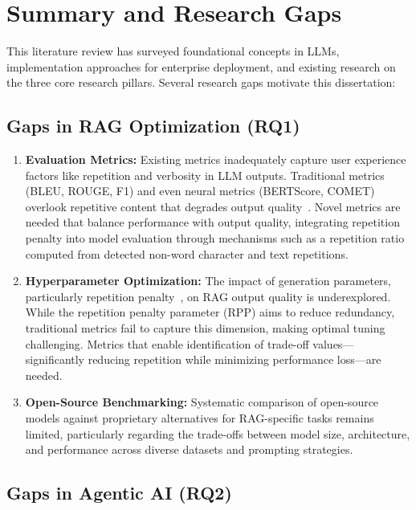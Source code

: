 \section{Summary and Research Gaps}
\label{sec:lit_summary}

This literature review has surveyed foundational concepts in LLMs, implementation approaches for enterprise deployment, and existing research on the three core research pillars. Several research gaps motivate this dissertation:

\subsection{Gaps in RAG Optimization (RQ1)}

\begin{enumerate}[leftmargin=*]
    \item \textbf{Evaluation Metrics:} Existing metrics inadequately capture user experience factors like repetition and verbosity in LLM outputs. Traditional metrics (BLEU, ROUGE, F1) and even neural metrics (BERTScore, COMET) overlook repetitive content that degrades output quality~\cite{fu2020repetition,holtzman2019degeneration}. Novel metrics are needed that balance performance with output quality, integrating repetition penalty into model evaluation through mechanisms such as a repetition ratio computed from detected non-word character and text repetitions.
    
    \item \textbf{Hyperparameter Optimization:} The impact of generation parameters, particularly repetition penalty~\cite{keskar2019ctrl}, on RAG output quality is underexplored. While the repetition penalty parameter (RPP) aims to reduce redundancy, traditional metrics fail to capture this dimension, making optimal tuning challenging. Metrics that enable identification of trade-off values---significantly reducing repetition while minimizing performance loss---are needed.
    
    \item \textbf{Open-Source Benchmarking:} Systematic comparison of open-source models against proprietary alternatives for RAG-specific tasks remains limited, particularly regarding the trade-offs between model size, architecture, and performance across diverse datasets and prompting strategies.
\end{enumerate}

\subsection{Gaps in Agentic AI (RQ2)}

